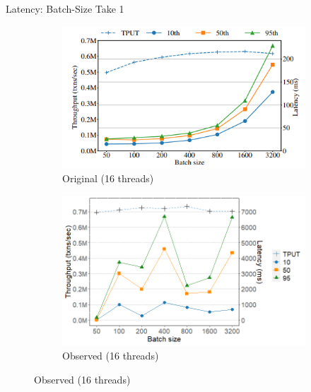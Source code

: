 \documentclass[xcolor=dvipsnames]{beamer}
\begin{document}
    \begin{frame}{Latency: Batch-Size Take 1}
        \begin{figure}
            \begin{subfigure}[h]{0.4\linewidth}
                \includegraphics[scale=0.50]{rolis_fig16.png}
                \caption{Original (16 threads)}
            \end{subfigure}
            \hfill
            \begin{subfigure}[h]{0.5\linewidth}
                \includegraphics[scale=0.30]{fig16_16t.png}
                \caption{Observed (16 threads)}
            \end{subfigure}
        \end{figure}
    \end{frame}
\end{document}
